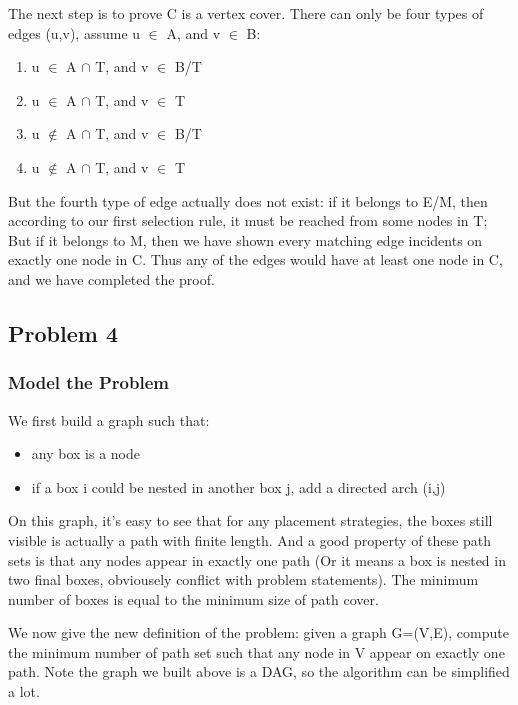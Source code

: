 \documentclass[paper=a4, fontsize=11pt]{scrartcl} %
\numberwithin{equation}{section} %
\numberwithin{figure}{section} %
\numberwithin{table}{section} %
\begin{document}
The next step is to prove C is a vertex cover. There can only be four types of
edges (u,v), assume u $\in$ A, and v $\in$ B:
\begin{enumerate}
\item u $\in$ A $\cap$ T, and v $\in$ B/T
\item u $\in$ A $\cap$ T, and v $\in$ T
\item u $\notin$ A $\cap$ T, and v $\in$ B/T
\item u $\notin$ A $\cap$ T, and v $\in$ T
\end{enumerate}

But the fourth type of edge actually does not exist: if it belongs to E/M, then
according to our first selection rule, it must be reached from some nodes in T;
But if it belongs to M, then we have shown every matching edge incidents on
exactly one node in C. Thus any of the edges would have at least one node in C,
and we have completed the proof.



\subsection*{Problem 4}
\subsubsection*{\textbf{Model the Problem}}
We first build a graph such that:
\begin{itemize}
\item any box is a node
\item if a box i could be nested in another box j, add a directed arch (i,j)
\end{itemize}

On this graph, it's easy to see that for any placement strategies, the boxes
still visible is actually a path with finite length. And a good property of
these path sets is that any nodes appear in exactly one path (Or it means a
box is nested in two final boxes, obviousely conflict with problem statements).
The minimum number of boxes is equal to the minimum size of path cover.

We now give the new definition of the problem: given a graph G=(V,E), compute
the minimum number of path set such that any node in V appear on exactly one
path. Note the graph we built above is a DAG, so the algorithm can be
simplified a lot.
\end{document}
